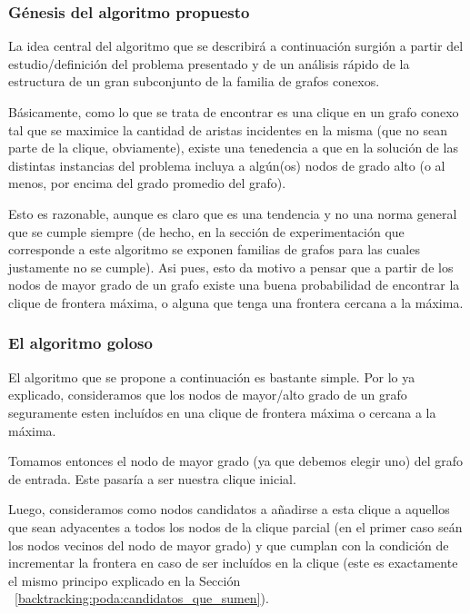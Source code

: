 \subsubsection{G\'enesis del algoritmo propuesto}
\par La idea central del algoritmo que se describir\'a a continuaci\'on
    surgi\'on a partir del estudio/definici\'on del problema presentado
    y de un an\'alisis r\'apido de la estructura de un gran subconjunto
    de la familia de grafos conexos.

\par B\'asicamente, como lo que se trata de encontrar es una clique
    en un grafo conexo tal que se maximice la cantidad de aristas
    incidentes en la misma (que no sean parte de la clique, obviamente),
    existe una tenedencia a que en la soluci\'on de las distintas
    instancias del problema incluya a alg\'un(os) nodos de grado
    alto (o al menos, por encima del grado promedio del grafo).

\par Esto es razonable, aunque es claro que es una tendencia y no
    una norma general que se cumple siempre (de hecho, en la secci\'on
    de experimentaci\'on que corresponde a este algoritmo se exponen
    familias de grafos para las cuales justamente no se cumple). Asi pues,
    esto da motivo a pensar que a partir de los nodos de mayor grado
    de un grafo existe una buena probabilidad de encontrar la clique
    de frontera m\'axima, o alguna que tenga una frontera cercana
    a la m\'axima.

\subsubsection{El algoritmo goloso}\label{backtracking:explicacion}
\par El algoritmo que se propone a continuaci\'on es bastante simple.
    Por lo ya explicado, consideramos que los nodos de mayor/alto
    grado de un grafo seguramente esten inclu\'idos en una clique
    de frontera m\'axima o cercana a la m\'axima.

\par Tomamos entonces el nodo de mayor grado (ya que debemos elegir uno)
    del grafo de entrada. Este pasar\'ia a ser nuestra clique inicial.

\par Luego, consideramos como nodos candidatos a a\~nadirse a esta
    clique a aquellos que sean adyacentes a todos los nodos de la
    clique parcial (en el primer caso se\'an los nodos vecinos del
    nodo de mayor grado) y que cumplan con la condici\'on de incrementar
    la frontera en caso de ser inclu\'idos en la clique (este es
    exactamente el mismo principo explicado en la Secci\'on%
    ~\ref{backtracking:poda:candidatos_que_sumen}).

